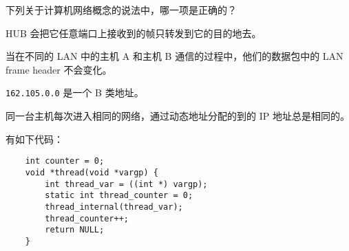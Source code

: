 \begin{problems}
\begin{choices}
        \end{choices}
         下列关于计算机网络概念的说法中，哪一项是正确的？
        \begin{choices}
            \item HUB 会把它任意端口上接收到的帧只转发到它的目的地去。
            \item 当在不同的 LAN 中的主机 A 和主机 B 通信的过程中，他们的数据包中的 LAN frame header 不会变化。
            \item \verb|162.105.0.0| 是一个 B 类地址。
            \item 同一台主机每次进入相同的网络，通过动态地址分配的到的 IP 地址总是相同的。
        \end{choices}
         有如下代码：
        \begin{verbatim}
    int counter = 0;
    void *thread(void *vargp) {
        int thread_var = ((int *) vargp);
        static int thread_counter = 0;
        thread_internal(thread_var);
        thread_counter++;
        return NULL;
    }


\end{verbatim}
\end{problems}
